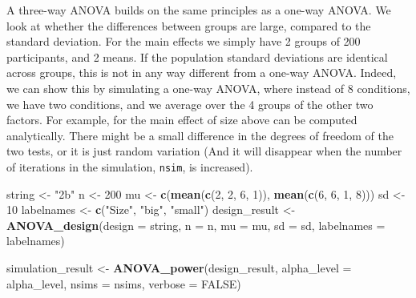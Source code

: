 \documentclass[]{book}
\newenvironment{Shaded}{\begin{snugshade}}{\end{snugshade}}
\newcommand{\DataTypeTok}[1]{\textcolor[rgb]{0.13,0.29,0.53}{#1}}
\newcommand{\DecValTok}[1]{\textcolor[rgb]{0.00,0.00,0.81}{#1}}
\newcommand{\KeywordTok}[1]{\textcolor[rgb]{0.13,0.29,0.53}{\textbf{#1}}}
\newcommand{\NormalTok}[1]{#1}
\newcommand{\OtherTok}[1]{\textcolor[rgb]{0.56,0.35,0.01}{#1}}
\newcommand{\StringTok}[1]{\textcolor[rgb]{0.31,0.60,0.02}{#1}}
\begin{document}
A three-way ANOVA builds on the same principles as a one-way ANOVA. We look at whether the differences between groups are large, compared to the standard deviation. For the main effects we simply have 2 groups of 200 participants, and 2 means. If the population standard deviations are identical across groups, this is not in any way different from a one-way ANOVA. Indeed, we can show this by simulating a one-way ANOVA, where instead of 8 conditions, we have two conditions, and we average over the 4 groups of the other two factors. For example, for the main effect of size above can be computed analytically. There might be a small difference in the degrees of freedom of the two tests, or it is just random variation (And it will disappear when the number of iterations in the simulation, \texttt{nsim}, is increased).

\begin{Shaded}
\begin{Highlighting}[]
\NormalTok{string <-}\StringTok{ "2b"}
\NormalTok{n <-}\StringTok{ }\DecValTok{200}
\NormalTok{mu <-}\StringTok{ }\KeywordTok{c}\NormalTok{(}\KeywordTok{mean}\NormalTok{(}\KeywordTok{c}\NormalTok{(}\DecValTok{2}\NormalTok{, }\DecValTok{2}\NormalTok{, }\DecValTok{6}\NormalTok{, }\DecValTok{1}\NormalTok{)), }\KeywordTok{mean}\NormalTok{(}\KeywordTok{c}\NormalTok{(}\DecValTok{6}\NormalTok{, }\DecValTok{6}\NormalTok{, }\DecValTok{1}\NormalTok{, }\DecValTok{8}\NormalTok{)))}
\NormalTok{sd <-}\StringTok{ }\DecValTok{10}
\NormalTok{labelnames <-}\StringTok{ }\KeywordTok{c}\NormalTok{(}\StringTok{"Size"}\NormalTok{, }\StringTok{"big"}\NormalTok{, }\StringTok{"small"}\NormalTok{)}
\NormalTok{design_result <-}\StringTok{ }\KeywordTok{ANOVA_design}\NormalTok{(}\DataTypeTok{design =}\NormalTok{ string,}
                   \DataTypeTok{n =}\NormalTok{ n, }
                   \DataTypeTok{mu =}\NormalTok{ mu, }
                   \DataTypeTok{sd =}\NormalTok{ sd, }
                   \DataTypeTok{labelnames =}\NormalTok{ labelnames)}
\end{Highlighting}
\end{Shaded}

\begin{Shaded}
\begin{Highlighting}[]
\NormalTok{simulation_result <-}\StringTok{ }\KeywordTok{ANOVA_power}\NormalTok{(design_result, }
                                 \DataTypeTok{alpha_level =}\NormalTok{ alpha_level, }
                                 \DataTypeTok{nsims =}\NormalTok{ nsims,}
                                 \DataTypeTok{verbose =} \OtherTok{FALSE}\NormalTok{)}
\end{Highlighting}
\end{Shaded}
\end{document}
